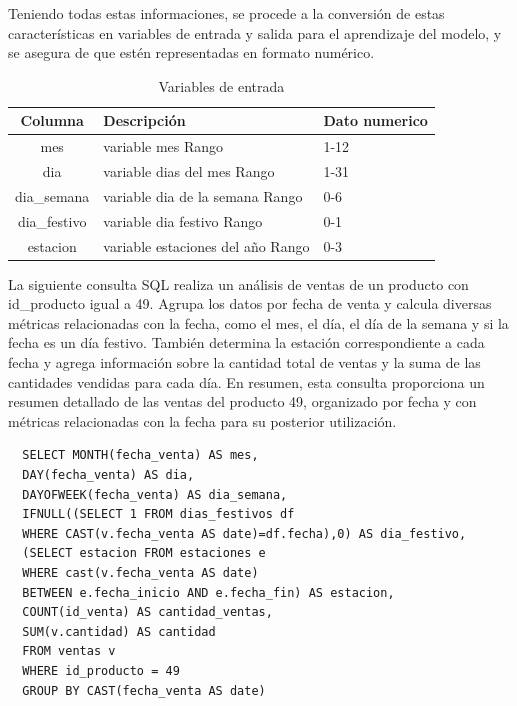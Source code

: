 \vspace{1\baselineskip} Teniendo todas estas informaciones, se procede a la
conversión de estas características en variables de entrada y salida para el
aprendizaje del modelo, y se asegura de que estén representadas en formato
numérico.

\begin{table}[H]
  \begin{tabular}{|c|l|l|}  %
    \hline
    \rowcolor{gray!50} \textbf{Columna} & \textbf{Descripción}              & \textbf{Dato numerico} \\
    \hline
    mes                                 & variable mes Rango                & 1-12                   \\
    dia                                 & variable dias del mes Rango       & 1-31                   \\
    dia\_semana                         & variable dia de la semana Rango   & 0-6                    \\
    dia\_festivo                        & variable dia festivo Rango        & 0-1                    \\
    estacion                            & variable estaciones del año Rango & 0-3                    \\
    \hline
  \end{tabular}
  \centering
  \caption{ Variables de entrada}
  \label{tab:variables_de _entrada} %
\end{table}

La siguiente consulta SQL realiza un análisis de ventas de un producto con
id\_producto igual a 49. Agrupa los datos por fecha de venta y calcula diversas
métricas relacionadas con la fecha, como el mes, el día, el día de la semana y
si la fecha es un día festivo. También determina la estación correspondiente a
cada fecha y agrega información sobre la cantidad total de ventas y la suma de
las cantidades vendidas para cada día. En resumen, esta consulta proporciona un
resumen detallado de las ventas del producto 49, organizado por fecha y con
métricas relacionadas con la fecha para su posterior utilización.

\begin{verbatim}
  SELECT MONTH(fecha_venta) AS mes, 
  DAY(fecha_venta) AS dia, 
  DAYOFWEEK(fecha_venta) AS dia_semana, 
  IFNULL((SELECT 1 FROM dias_festivos df 
  WHERE CAST(v.fecha_venta AS date)=df.fecha),0) AS dia_festivo, 
  (SELECT estacion FROM estaciones e 
  WHERE cast(v.fecha_venta AS date) 
  BETWEEN e.fecha_inicio AND e.fecha_fin) AS estacion,
  COUNT(id_venta) AS cantidad_ventas, 
  SUM(v.cantidad) AS cantidad 
  FROM ventas v 
  WHERE id_producto = 49 
  GROUP BY CAST(fecha_venta AS date)
\end{verbatim}

